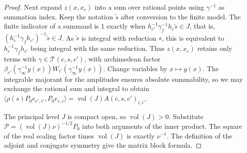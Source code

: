 \begin{proof}
Next expand $z(x,x_c)$ into a sum over rational points using $\gamma^{-1}$ as summation index.
Keep the notation $\widetilde s$ after conversion to the finite model. The finite indicator of a summand is $1$ exactly when
$h_{c'}^{-1}\gamma_f^{-1}h_c\widetilde s\in J$, that is, $(h_c^{-1}\gamma_f h_{c'})^{-1}\widetilde s\in J$.
As $\widetilde s$ is integral with reduction $s$, this is equivalent to
$h_c^{-1}\gamma_f h_{c'}$ being integral with the same reduction.
Thus $z(x,x_c)$ retains only terms with $\gamma\in\mathcal T(c,s,c')$, with
archimedean factor $\beta_{c'}(\gamma_\infty^{-1}y(x))
W_{i'}(\gamma_\infty^{-1}y(x))$.
Change variables by $x\mapsto y(x)$. The integrable majorant for the amplitudes ensures absolute summability,
so we may exchange the rational sum and integral to obtain
$\langle \rho(s)P_0e_{c',i'},P_0e_{c,i}\rangle=\operatorname{vol}(J)A(c,s,c')_{i,i'}$.

The principal level $J$ is compact open, so $\operatorname{vol}(J)>0$.
Substitute $\mathcal P=(\operatorname{vol}(J)\nu)^{-1/2}P_0$ into both arguments of the inner product.
The square of the real scaling factor times $\operatorname{vol}(J)$ is exactly $\nu^{-1}$.
The definition of the adjoint and conjugate symmetry give the matrix block formula.
\end{proof}


